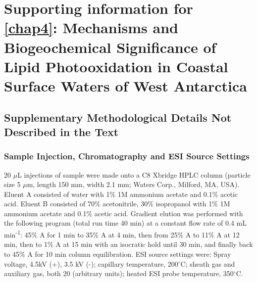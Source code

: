 
\begingroup%
\makeatletter%
\cleardoublepage%
\let\newpage\relax%
\let\clearpage\relax%
\vspace*{\fill}%
\vspace*{\dimexpr-50\p@-\baselineskip}%
\chapter[Supporting information for Chapter 4]{{\setlength{\huge} Supporting information for}\\ \autoref{chap4}: Mechanisms and Biogeochemical Significance of Lipid Photooxidation in Coastal Surface Waters of West Antarctica}
\label{AppE}
\vspace*{\fill}%
\endgroup%

\clearpage

\section{Supplementary Methodological Details Not Described in the Text}

\subsection{Sample Injection, Chromatography and ESI Source Settings}

20 $\mu$L injections of sample were made onto a C8 Xbridge HPLC column (particle size 5 $\mu$m, length 150 mm, width 2.1 mm; Waters Corp., Milford, MA, USA). Eluent A consisted of water with 1\% 1M ammonium acetate and 0.1\% acetic acid. Eluent B consisted of 70\% acetonitrile, 30\% isopropanol with 1\% 1M ammonium acetate and 0.1\% acetic acid. Gradient elution was performed with the following program (total run time 40 min) at a constant flow rate of 0.4 mL min\textsuperscript{-1}: 45\% A for 1 min to 35\% A at 4 min, then from 25\% A to 11\% A at 12 min, then to 1\% A at 15 min with an isocratic hold until 30 min, and finally back to 45\% A for 10 min column equilibration. ESI source settings were: Spray voltage, 4.5kV (+), 3.5 kV (-); capillary temperature, 200$^{\circ}$C; sheath gas and auxiliary gas, both 20 (arbitrary units); heated ESI probe temperature, 350$^{\circ}$C.

